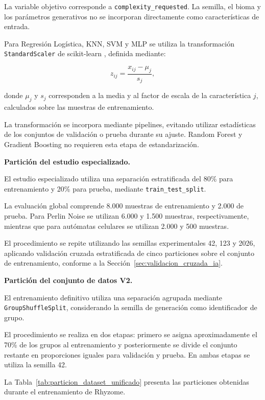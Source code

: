 La variable objetivo corresponde a \texttt{complexity\_requested}. La semilla, el bioma y los parámetros generativos no se incorporan directamente como características de entrada.

Para Regresión Logística, KNN, SVM y MLP se utiliza la transformación \texttt{StandardScaler} de scikit-learn \parencite{pedregosa2011}, definida mediante:

\begin{equation}
	z_{ij} =
	\frac{x_{ij}-\mu_j}{s_j},
	\label{eq:estandarizacion_caracteristicas}
\end{equation}

donde $\mu_j$ y $s_j$ corresponden a la media y al factor de escala de la característica $j$, calculados sobre las muestras de entrenamiento.

La transformación se incorpora mediante pipelines, evitando utilizar estadísticas de los conjuntos de validación o prueba durante su ajuste. Random Forest y Gradient Boosting no requieren esta etapa de estandarización.

\textbf{Partición del estudio especializado.}

El estudio especializado utiliza una separación estratificada del 80\% para entrenamiento y 20\% para prueba, mediante \texttt{train\_test\_split}.

La evaluación global comprende 8.000 muestras de entrenamiento y 2.000 de prueba. Para Perlin Noise se utilizan 6.000 y 1.500 muestras, respectivamente, mientras que para autómatas celulares se utilizan 2.000 y 500 muestras.

El procedimiento se repite utilizando las semillas experimentales 42, 123 y 2026, aplicando validación cruzada estratificada de cinco particiones sobre el conjunto de entrenamiento, conforme a la Sección~\ref{sec:validacion_cruzada_ia}.

\textbf{Partición del conjunto de datos V2.}

El entrenamiento definitivo utiliza una separación agrupada mediante \texttt{GroupShuffleSplit}, considerando la semilla de generación como identificador de grupo.

El procedimiento se realiza en dos etapas: primero se asigna aproximadamente el 70\% de los grupos al entrenamiento y posteriormente se divide el conjunto restante en proporciones iguales para validación y prueba. En ambas etapas se utiliza la semilla 42.

La Tabla~\ref{tab:particion_dataset_unificado} presenta las particiones obtenidas durante el entrenamiento de Rhyzome.

